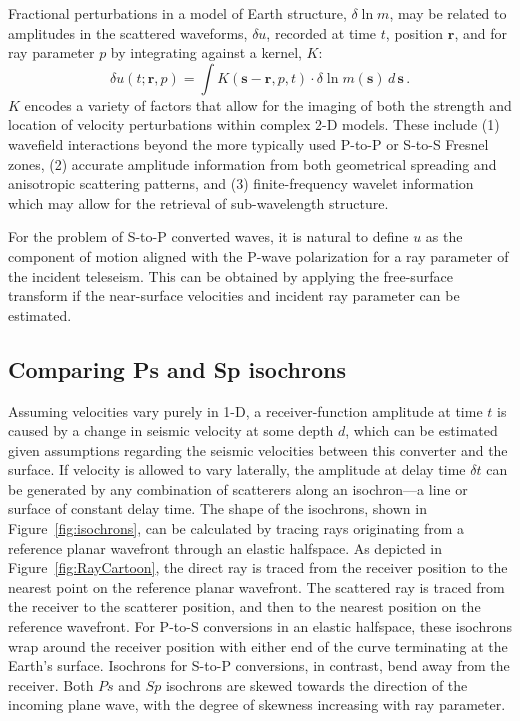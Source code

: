 \documentclass[referee]{gji}
\begin{document}
Fractional perturbations in a model of Earth structure, $\delta \ln{m}$, may be related to amplitudes in the scattered waveforms, $\delta u$, recorded at time $t$, position $\textbf{r}$, and for ray parameter $p$ by integrating against a kernel, $K$:
\begin{equation}
\delta u(t;\textbf{r},p) = \int K(\textbf{s}-\textbf{r},p,t) \cdot \delta \ln{m(\textbf{s})} \, d \, \textbf{s} \,.
\label{eqn:kernel_def}
\end{equation}
$K$ encodes a variety of factors that allow for the imaging of both the strength and location of velocity perturbations within complex 2-D models.  These include (1) wavefield interactions beyond the more typically used P-to-P or S-to-S Fresnel zones, (2) accurate amplitude information from both geometrical spreading and anisotropic scattering patterns, and (3) finite-frequency wavelet information which may allow for the retrieval of sub-wavelength structure.

For the problem of S-to-P converted waves, it is natural to define $u$ as the component of motion aligned with the P-wave polarization for a ray parameter of the incident teleseism.  This can be obtained by applying the free-surface transform \citep{Kennett1991a} if the near-surface velocities and incident ray parameter can be estimated.

\subsection{Comparing Ps and Sp isochrons}

Assuming velocities vary purely in 1-D, a receiver-function amplitude at time $t$ is caused by a change in seismic velocity at some depth $d$, which can be estimated given assumptions regarding the seismic velocities between this converter and the surface. If velocity is allowed to vary laterally, the amplitude at delay time $\delta t$ can be generated by any combination of scatterers along an isochron---a line or surface of constant delay time. The shape of the isochrons, shown in Figure~\ref{fig:isochrons}, can be calculated by tracing rays originating from a reference planar wavefront through an elastic halfspace.  As depicted in Figure~\ref{fig:RayCartoon}, the direct ray is traced from the receiver position to the nearest point on the reference planar wavefront.  The scattered ray is traced from the receiver to the scatterer position, and then to the nearest position on the reference wavefront.  For P-to-S conversions in an elastic halfspace, these isochrons wrap around the receiver position with either end of the curve terminating at the Earth's surface.  Isochrons for S-to-P conversions, in contrast, bend away from the receiver.  Both $Ps$ and $Sp$ isochrons are skewed towards the direction of the incoming plane wave, with the degree of skewness increasing with ray parameter.
\end{document}
